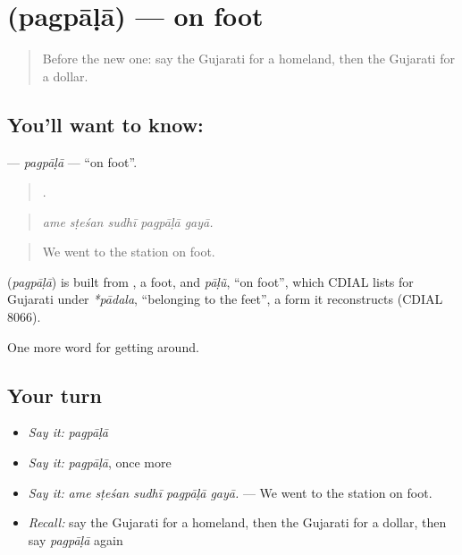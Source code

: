 \section[\texorpdfstring{\gu{પગપાળા} (pagpāḷā)}{પગપાળા (pagpāḷā)}]{ (pagpāḷā) — on foot}

\label{lesson:GU-C407-pagpala}



\begin{quote}
Before the new one: say the Gujarati for a homeland, then the Gujarati for a dollar.
\end{quote}

\subsection*{You'll want to know: }
\textbf{} — \emph{pagpāḷā} — \textquotedblleft{}on foot\textquotedblright{}.

\begin{quote}
    .
\end{quote}

\begin{quote}
\emph{ame sṭeśan sudhī pagpāḷā gayā.}
\end{quote}

\begin{quote}
We went to the station on foot.
\end{quote}

\begin{cousinweb}
\textbf{} (\emph{pagpāḷā}) is built from , a foot, and \emph{pāḷũ}, \textquotedblleft{}on foot\textquotedblright{}, which CDIAL lists for Gujarati under \emph{*pādala}, \textquotedblleft{}belonging to the feet\textquotedblright{}, a form it reconstructs (CDIAL 8066).
\end{cousinweb}

\begin{grammarlens}[title={What you've built}]
One more word for getting around.
\end{grammarlens}

\subsection*{Your turn}
\begin{itemize}
\raggedright
  \item \emph{Say it:} \emph{pagpāḷā}
  \item \emph{Say it:} \emph{pagpāḷā}, once more
  \item \emph{Say it:} \emph{ame sṭeśan sudhī pagpāḷā gayā.} — We went to the station on foot.
  \item \emph{Recall:} say the Gujarati for a homeland, then the Gujarati for a dollar, then say \emph{pagpāḷā} again
\end{itemize}

